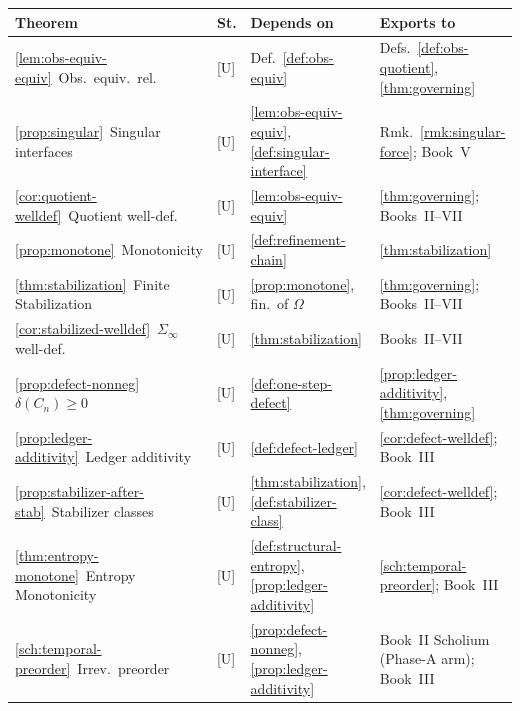 \documentclass[12pt,oneside]{amsbook}
\theoremstyle{plain}
\theoremstyle{definition}
\theoremstyle{remark}
\begin{document}
\medskip
\renewcommand{\arraystretch}{1.4}
\noindent
\begin{tabular}{@{}p{3.6cm}p{0.8cm}p{3.8cm}p{4.8cm}@{}}
\hline
\textbf{Theorem} & \textbf{St.} & \textbf{Depends on} & \textbf{Exports to} \\
\hline
\ref{lem:obs-equiv-equiv}\ Obs.\ equiv.\ rel.
  & [U] & Def.~\ref{def:obs-equiv}
  & Defs.~\ref{def:obs-quotient}, \ref{thm:governing} \\

\ref{prop:singular}\ Singular interfaces
  & [U] & \ref{lem:obs-equiv-equiv}, \ref{def:singular-interface}
  & Rmk.~\ref{rmk:singular-force}; Book~V \\

\ref{cor:quotient-welldef}\ Quotient well-def.
  & [U] & \ref{lem:obs-equiv-equiv}
  & \ref{thm:governing}; Books~II--VII \\

\ref{prop:monotone}\ Monotonicity
  & [U] & \ref{def:refinement-chain}
  & \ref{thm:stabilization} \\

\ref{thm:stabilization}\ Finite Stabilization
  & [U] & \ref{prop:monotone}, fin.\ of $\Omega$
  & \ref{thm:governing}; Books~II--VII \\

\ref{cor:stabilized-welldef}\ $\Sigma_\infty$ well-def.
  & [U] & \ref{thm:stabilization}
  & Books~II--VII \\

\ref{prop:defect-nonneg}\ $\delta(C_n)\geq 0$
  & [U] & \ref{def:one-step-defect}
  & \ref{prop:ledger-additivity}, \ref{thm:governing} \\

\ref{prop:ledger-additivity}\ Ledger additivity
  & [U] & \ref{def:defect-ledger}
  & \ref{cor:defect-welldef}; Book~III \\

\ref{prop:stabilizer-after-stab}\ Stabilizer classes
  & [U] & \ref{thm:stabilization}, \ref{def:stabilizer-class}
  & \ref{cor:defect-welldef}; Book~III \\

\ref{thm:entropy-monotone}\ Entropy Monotonicity
  & [U] & \ref{def:structural-entropy}, \ref{prop:ledger-additivity}
  & \ref{sch:temporal-preorder}; Book~III \\

\ref{sch:temporal-preorder}\ Irrev.\ preorder
  & [U] & \ref{prop:defect-nonneg}, \ref{prop:ledger-additivity}
  & Book~II Scholium (Phase-A arm); Book~III \\


\end{tabular}
\end{document}
